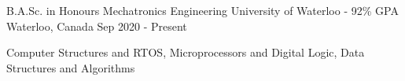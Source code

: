 

\begin{cventries}

  \cventry
    {B.A.Sc. in Honours Mechatronics Engineering} %
    {University of Waterloo - 92\% GPA} %
    {Waterloo, Canada} %
    {Sep 2020 - Present} %
    {
      \begin{cvitems}
        \item{Computer Structures and RTOS, Microprocessors and Digital Logic, Data Structures and Algorithms}
      \end{cvitems}
    }
\end{cventries}
